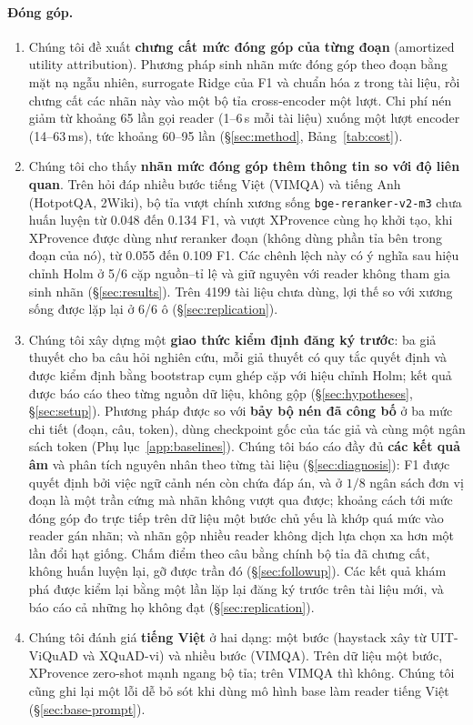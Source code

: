 \documentclass[11pt]{article}
\begin{document}
\paragraph{Đóng góp.}
\begin{enumerate}
  \item Chúng tôi đề xuất \textbf{chưng cất mức đóng góp của từng đoạn} (amortized utility
  attribution). Phương pháp sinh nhãn mức đóng góp theo đoạn bằng mặt nạ ngẫu nhiên, surrogate Ridge của F1 và chuẩn
  hóa z trong tài liệu, rồi chưng cất các nhãn này vào một bộ tỉa cross-encoder
  một lượt. Chi phí nén giảm từ khoảng 65 lần gọi reader (1--6\,s mỗi tài liệu) xuống một lượt
  encoder (14--63\,ms), tức khoảng 60--95 lần (\S\ref{sec:method}, Bảng~\ref{tab:cost}).
  \item Chúng tôi cho thấy \textbf{nhãn mức đóng góp thêm thông tin so với độ liên quan}. Trên hỏi đáp
  nhiều bước tiếng Việt (VIMQA) và tiếng Anh (HotpotQA, 2Wiki), bộ tỉa vượt chính xương sống
  \texttt{bge-reranker-v2-m3} chưa huấn luyện từ 0.048 đến 0.134 F1, và vượt XProvence cùng họ khởi
  tạo, khi XProvence được dùng như reranker đoạn (không dùng phần tỉa bên trong đoạn của nó), từ 0.055 đến 0.109 F1.
  Các chênh lệch này có ý nghĩa sau hiệu chỉnh Holm ở 5/6 cặp nguồn--tỉ lệ
  và giữ nguyên với reader không tham gia sinh nhãn (\S\ref{sec:results}). Trên 4199 tài liệu chưa dùng, lợi thế so
  với xương sống được lặp lại ở 6/6 ô (\S\ref{sec:replication}).
  \item Chúng tôi xây dựng một \textbf{giao thức kiểm định đăng ký trước}: ba giả thuyết cho
  ba câu hỏi nghiên cứu, mỗi giả thuyết có quy tắc quyết định và được kiểm định bằng bootstrap cụm
  ghép cặp với hiệu chỉnh Holm; kết quả được báo cáo theo từng nguồn dữ liệu, không gộp (\S\ref{sec:hypotheses}, \S\ref{sec:setup}). Phương pháp được so với \textbf{bảy
  bộ nén đã công bố} ở ba mức chi tiết (đoạn, câu, token), dùng checkpoint gốc của tác giả và
  cùng một ngân sách token (Phụ lục~\ref{app:baselines}). Chúng tôi báo cáo đầy đủ \textbf{các kết
  quả âm} và phân tích nguyên nhân theo từng tài liệu (\S\ref{sec:diagnosis}): F1 được quyết định bởi việc
  ngữ cảnh nén còn chứa đáp án, và ở $1/8$ ngân sách đơn vị đoạn là một trần cứng mà nhãn không vượt qua được;
  khoảng cách tới mức đóng góp đo trực tiếp trên dữ liệu một bước chủ yếu là khớp quá mức vào reader gán nhãn; và
  nhãn gộp nhiều reader không dịch lựa chọn xa hơn một lần đổi hạt giống. Chấm điểm theo câu bằng chính bộ tỉa
  đã chưng cất, không huấn luyện lại, gỡ được trần đó (\S\ref{sec:followup}). Các kết quả khám phá được kiểm lại
  bằng một lần lặp lại đăng ký trước trên tài liệu mới, và báo cáo cả những họ không đạt (\S\ref{sec:replication}).
  \item Chúng tôi đánh giá \textbf{tiếng Việt} ở hai dạng: một bước (haystack xây từ
  UIT-ViQuAD và XQuAD-vi) và nhiều bước (VIMQA). Trên dữ liệu một bước, XProvence zero-shot mạnh ngang
  bộ tỉa; trên VIMQA thì không. Chúng tôi cũng ghi lại một lỗi dễ bỏ sót khi dùng mô hình base làm
  reader tiếng Việt (\S\ref{sec:base-prompt}).
\end{enumerate}
\end{document}

